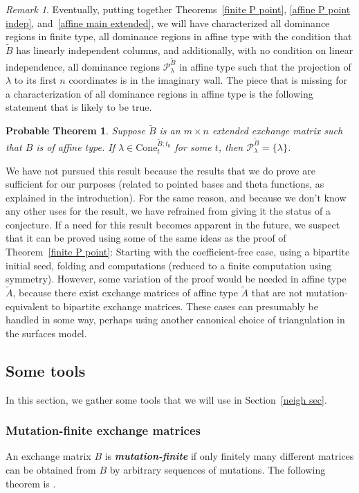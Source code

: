 \documentclass{amsart}
\newtheorem{probable}[proposition]{Probable Theorem}
\theoremstyle{definition}
\theoremstyle{remark}
\newtheorem{remark}[proposition]{Remark}
\numberwithin{equation}{section}
\newcommand{\newword}[1]{\textbf{\emph{#1}}}
\newcommand{\set}[1]{{\lbrace #1 \rbrace}}
\newcommand{\0}{{\mathbf{0}}}
\newcommand{\Cone}{\mathrm{Cone}}
\newcommand{\tB}{{\tilde{B}}}
\renewcommand{\P}{\mathcal{P}}
\begin{document}
\begin{remark}\label{affine P point remark}
Eventually, putting together Theorems~\ref{finite P point}, \ref{affine P point indep}, and~\ref{affine main extended}, we will have characterized all dominance regions in finite type, all dominance regions in affine type with the condition that $\tB$ has linearly independent columns, and additionally, with no condition on linear independence, all dominance regions $\P_\lambda^\tB$ in affine type such that the projection of $\lambda$ to its first $n$ coordinates is in the imaginary wall.
The piece that is missing for a characterization of all dominance regions in affine type is the following statement that is likely to be true.

\begin{probable}\label{affine P point} 
Suppose $\tB$ is an $m\times n$ extended exchange matrix such that $B$ is of affine type.
If $\lambda\in\Cone^{\tB;t_0}_t$ for some $t$, then $\P^\tB_\lambda=\set{\lambda}$.
\end{probable}

We have not pursued this result because the results that we do prove are sufficient for our purposes (related to pointed bases and theta functions, as explained in the introduction).
For the same reason, and because we don't know any other uses for the result, we have refrained from giving it the status of a conjecture. 
If a need for this result becomes apparent in the future, we suspect that it can be proved using some of the same ideas as the proof of Theorem~\ref{finite P point}:
Starting with the coefficient-free case, using a bipartite initial seed, folding and computations (reduced to a finite computation using symmetry).
However, some variation of the proof would be needed in affine type $\widetilde A$, because there exist exchange matrices of affine type $\widetilde A$ that are not mutation-equivalent to bipartite exchange matrices.
These cases can presumably be handled in some way, perhaps using another canonical choice of triangulation in the surfaces model.
\end{remark}


\subsection{Some tools}
In this section, we gather some tools that we will use in Section~\ref{neigh sec}.

\subsubsection{Mutation-finite exchange matrices}\label{mut fin sec}
An exchange matrix $B$ is \newword{mutation-finite} if only finitely many different matrices can be obtained from $B$ by arbitrary sequences of mutations.
The following theorem is \cite[Theorem~2.8]{FeShTu}.  
\end{document}
